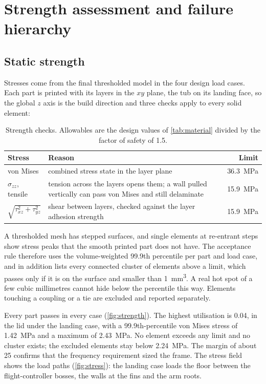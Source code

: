 \section{Strength assessment and failure hierarchy}\label{sec:strength}

\subsection{Static strength}

Stresses come from the final thresholded model in the four design load cases. Each part is printed with its layers in the $xy$ plane, the tub on its landing face, so the global $z$ axis is the build direction and three checks apply to every solid element:

\begin{table}[htbp]
\centering\small
\caption{Strength checks. Allowables are the design values of \cref{tab:material} divided by the factor of safety of 1.5.}\label{tab:strength}
\begin{tabularx}{\linewidth}{@{}lXr@{}}
\toprule
Stress & Reason & Limit\\
\midrule
von Mises & combined stress state in the layer plane & \SI{36.3}{MPa}\\
$\sigma_{zz}$, tensile & tension across the layers opens them; a wall pulled vertically can pass von Mises and still delaminate & \SI{15.9}{MPa}\\
$\sqrt{\tau_{xz}^2+\tau_{yz}^2}$ & shear between layers, checked against the layer adhesion strength & \SI{15.9}{MPa}\\
\bottomrule
\end{tabularx}
\end{table}

A thresholded mesh has stepped surfaces, and single elements at re-entrant steps show stress peaks that the smooth printed part does not have. The acceptance rule therefore uses the volume-weighted 99.9th percentile per part and load case, and in addition lists every connected cluster of elements above a limit, which passes only if it is on the surface and smaller than \SI{1}{mm^3}. A real hot spot of a few cubic millimetres cannot hide below the percentile this way. Elements touching a coupling or a tie are excluded and reported separately.

Every part passes in every case (\cref{fig:strength}). The highest utilisation is 0.04, in the lid under the landing case, with a 99.9th-percentile von Mises stress of \SI{1.42}{MPa} and a maximum of \SI{2.43}{MPa}. No element exceeds any limit and no cluster exists; the excluded elements stay below \SI{2.24}{MPa}. The margin of about 25 confirms that the frequency requirement sized the frame. The stress field shows the load paths (\cref{fig:stress}): the landing case loads the floor between the flight-controller bosses, the walls at the fins and the arm roots.

